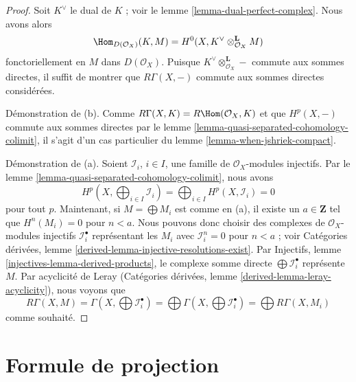 \begin{proof}
Soit $K^\vee$ le dual de $K$ ; voir le lemme \ref{lemma-dual-perfect-complex}. Nous avons alors $$
\Hom_{D(\mathcal{O}_X)}(K, M) =
H^0(X, K^\vee \otimes_{\mathcal{O}_X}^\mathbf{L} M)
$$ fonctoriellement en $M$ dans $D(\mathcal{O}_X)$. Puisque $K^\vee \otimes_{\mathcal{O}_X}^\mathbf{L} -$ commute aux sommes directes, il suffit de montrer que $R\Gamma(X, -)$ commute aux sommes directes considérées.

\medskip\noindent
Démonstration de (b). Comme $R\Gamma(X, K) = R\Hom(\mathcal{O}_X, K)$ et que $H^p(X, -)$ commute aux sommes directes par le lemme \ref{lemma-quasi-separated-cohomology-colimit}, il s'agit d'un cas particulier du lemme \ref{lemma-when-jshriek-compact}.

\medskip\noindent

Démonstration de (a). Soient $\mathcal{I}_i$, $i \in I$, une famille de
$\mathcal{O}_X$-modules injectifs. Par le lemme \ref{lemma-quasi-separated-cohomology-colimit},
nous avons
$$
H^p(X, \bigoplus\nolimits_{i \in I} \mathcal{I}_i) =
\bigoplus\nolimits_{i \in I} H^p(X, \mathcal{I}_i) = 0
$$
pour tout $p$. Maintenant, si $M = \bigoplus M_i$ est comme en (a), il existe un $a \in \mathbf{Z}$ tel que $H^n(M_i) = 0$
pour $n < a$. Nous pouvons donc choisir des complexes de $\mathcal{O}_X$-modules injectifs
$\mathcal{I}_i^\bullet$ représentant les $M_i$
avec $\mathcal{I}_i^n = 0$ pour $n < a$ ; voir Catégories dérivées, lemme \ref{derived-lemma-injective-resolutions-exist}. Par Injectifs, lemme \ref{injectives-lemma-derived-products},
le complexe somme directe $\bigoplus \mathcal{I}_i^\bullet$
représente $M$. Par acyclicité de Leray (Catégories dérivées, lemme \ref{derived-lemma-leray-acyclicity}), nous voyons que
$$
R\Gamma(X, M) = \Gamma(X, \bigoplus \mathcal{I}_i^\bullet) =
\bigoplus \Gamma(X, \bigoplus \mathcal{I}_i^\bullet) =
\bigoplus R\Gamma(X, M_i)
$$
comme souhaité.

\end{proof}

















\section{Formule de projection}

